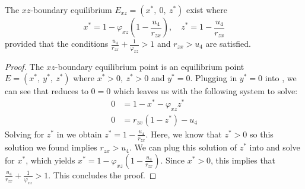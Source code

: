 \begin{theorem}\label{thm:boundary-xz-exist}
    The $xz$-boundary equilibrium $E_{xz}=\left(x^*,\ 0,\ z^*\right)$ exist where
    \begin{equation*}
        x^*=1-\varphi_{xz}\left(1-\frac{u_4}{r_{zx}}\right),\quad
        z^*=1-\frac{u_4}{r_{zx}}
    \end{equation*}
    provided that the conditions $\frac{u_4}{r_{zx}}+\frac{1}{\varphi_{xz}} > 1$ and $r_{zx}>u_4$ are satisfied.
\end{theorem}
\begin{proof}
    The $xz$-boundary equilibrium point is an equilibrium point $E=\left(x^*,\ y^*,\ z^*\right)$ where $x^*>0,\ z^*>0$ and $y^*=0$.
    Plugging in $y^*=0$ into , we can see that  reduces to $0=0$ which leaves us with the following system to solve:
    \begin{subequations}\label{system:xz-boundary}
        \begin{align}
            0 &= 1-x^*-\varphi_{xz}z^* \label{eq:xz-boundary-x}\\
            0 &= r_{zx}\left(1-z^*\right)-u_4 \label{eq:xz-boundary-z}
        \end{align}
    \end{subequations}
    Solving for $z^*$ in  we obtain $z^*=1-\frac{u_4}{r_{zx}}$.
    Here, we know that $z^*>0$ so this solution we found implies $r_{zx}>u_4$.
    We can plug this solution of $z^*$ into  and solve for $x^*$, which yields $x^*=1-\varphi_{xz}\left(1-\frac{u_4}{r_{zx}}\right)$.
    Since $x^*>0$, this implies that $\frac{u_4}{r_{zx}}+\frac{1}{\varphi_{xz}} > 1$.
    This concludes the proof.
\end{proof}
